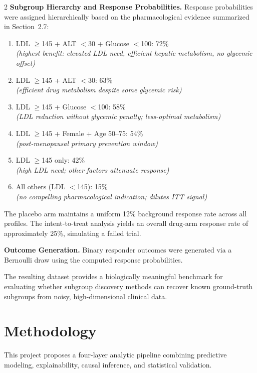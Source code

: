 \documentclass[12pt]{article}
\begin{document}
\begin{multicols}{2}
\textbf{Subgroup Hierarchy and Response Probabilities.}
Response probabilities were assigned hierarchically based on the
pharmacological evidence summarized in Section~2.7:
\begin{enumerate}
\item LDL $\geq$145 + ALT $<$30 + Glucose $<$100: 72\%\\
  \textit{(highest benefit: elevated LDL need, efficient hepatic metabolism,
  no glycemic offset)}
\item LDL $\geq$145 + ALT $<$30: 63\%\\
  \textit{(efficient drug metabolism despite some glycemic risk)}
\item LDL $\geq$145 + Glucose $<$100: 58\%\\
  \textit{(LDL reduction without glycemic penalty; less-optimal metabolism)}
\item LDL $\geq$145 + Female + Age 50--75: 54\%\\
  \textit{(post-menopausal primary prevention window)}
\item LDL $\geq$145 only: 42\%\\
  \textit{(high LDL need; other factors attenuate response)}
\item All others (LDL $<$145): 15\%\\
  \textit{(no compelling pharmacological indication; dilutes ITT signal)}
\end{enumerate}
The placebo arm maintains a uniform 12\% background response rate across all
profiles.  The intent-to-treat analysis yields an overall drug-arm response
rate of approximately 25\%, simulating a failed trial.

\textbf{Outcome Generation.}
Binary responder outcomes were generated via a Bernoulli draw using the
computed response probabilities.

The resulting dataset provides a biologically meaningful benchmark for
evaluating whether subgroup discovery methods can recover known ground-truth
subgroups from noisy, high-dimensional clinical data.

\section{Methodology}

This project proposes a four-layer analytic pipeline combining predictive
modeling, explainability, causal inference, and statistical validation.


\end{multicols}
\end{document}
